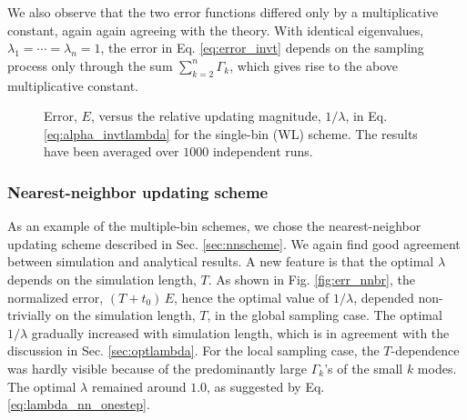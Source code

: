 \documentclass[reprint, floatfix]{revtex4-1}
\newcommand{\Err}{E}
\begin{document}
We also observe
that the two error functions
differed only by a multiplicative constant,
again again agreeing with the theory.
%
With identical eigenvalues,
$\lambda_1 = \cdots = \lambda_n = 1$,
the error in Eq. \eqref{eq:error_invt}
depends on the sampling process only through
the sum $\sum_{ k = 2 }^n \Gamma_k$,
which gives rise to the above multiplicative constant.


\begin{figure}[h]
\begin{center}
  \caption{
    \label{fig:err_singlebin}
    Error, $E$, versus the
    relative updating magnitude,
    $1/\lambda$,
    in Eq. \eqref{eq:alpha_invtlambda}
    for the single-bin (WL) scheme.
    The results have been averaged over $1000$ independent runs.
  }
\end{center}
\end{figure}



\subsubsection{Nearest-neighbor updating scheme}


As an example of the multiple-bin schemes,
we chose the nearest-neighbor updating scheme
described in Sec. \eqref{sec:nnscheme}.
%
We again find good agreement
between simulation and analytical results.
%
A new feature is that the optimal $\lambda$
depends on the simulation length, $T$.
%
As shown in Fig. \ref{fig:err_nnbr},
the normalized error, $(T + t_0) \, \Err$,
hence the optimal value of $1/\lambda$,
depended non-trivially on the simulation length, $T$,
in the global sampling case.
%
The optimal $1/\lambda$ gradually increased
with simulation length, which is in agreement with
the discussion in Sec. \ref{sec:optlambda}.
%
For the local sampling case,
the $T$-dependence was hardly visible
because of the predominantly large $\Gamma_k$'s
of the small $k$ modes.
%
The optimal $\lambda$ remained around $1.0$,
as suggested by Eq. \eqref{eq:lambda_nn_onestep}.
\end{document}
